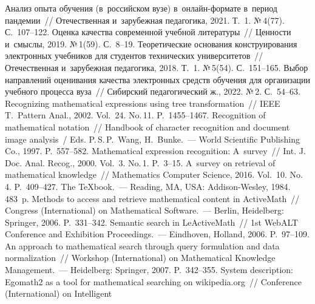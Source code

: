 \begin{multicols}{2}
{\small\frenchspacing
 {%
 \begin{thebibliography}{99}
 Анализ опыта обуче\-ния (в~российском вузе)  
в~он\-лайн-фор\-ма\-те в~период пандемии~// Отечественная и~зарубежная педагогика, 
2021. Т.~1. №\,4(77). С.~107--122.
 Оценка качества современной учебной литературы~// Ценности 
и~смыслы, 2019. №\,1(59). С.~8--19.
 Теоретические основания конструирования электронных 
учебников для студентов технических университетов~// Отечественная и~зарубежная 
педагогика, 2018. Т.~1. №\,5(54). С.~151--165.
 Выбор на\-прав\-ле\-ний оценивания 
качества электронных средств обуче\-ния для организации учебного процесса вуза~// 
Сибирский педагогический ж., 2022. №\,2. С.~54--63.
 Recognizing mathematical expressions using tree 
transformation~// IEEE T.~Pattern Anal., 2002. Vol.~24. No.\,11. P.~1455--1467.
 Recognition of mathematical notation~// Handbook of character 
recognition and document image analysis~/ Eds. P.\,S.\,P.~Wang, H.~Bunke.~--- World 
Scientific Publishing Co., 1997. P.~557--582.
 Mathematical expression recognition: A~survey~// Int. J. Doc. Anal. Recog., 2000. 
Vol.~3. No.\,1. P.~3--15.
 A~survey on retrieval of mathematical knowledge~// Mathematics 
Computer Science, 2016. Vol.~10. No.\,4. P.~409--427.
 The \TeX book.~--- Reading, MA, USA: Addison-Wesley, 1984. 483~p.
 Methods to access and retrieve mathematical content in 
ActiveMath~//  Congress (International)  on Mathematical Software.~--- Berlin, Heidelberg: 
Springer, 2006. P.~331--342.
 Semantic search in \mbox{LeActiveMath}~//  1st WebALT Conference and 
Exhibition Proceedings.~---  Eindhoven, Holland, 2006. P.~97--109.
 An approach to mathematical search through query formulation 
and data normalization~// Workshop (International) on Mathematical Knowledge 
Management.~--- Heidelberg: Springer, 2007. P.~342--355.
 System description: Egomath2 as a tool 
for mathematical searching on wikipedia.org~//  Conference (International) on Intelligent 

\end{thebibliography}}}
\end{multicols}
